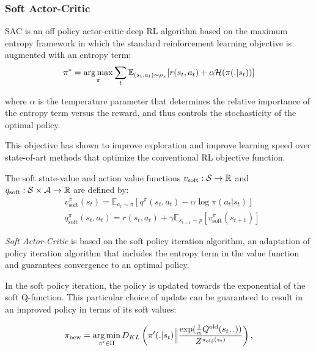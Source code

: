 \subsubsection{Soft Actor-Critic}
SAC \cite{SAC, SAC_modified} is an off policy actor-critic deep RL algorithm based on the maximum entropy framework in which the standard reinforcement learning
objective is augmented with an entropy term:
\begin{equation*}
    \pi^* = \operatorname*{arg\,max}_\pi \sum_t \mathbb{E}_{(s_t, a_t) \sim \rho_\pi}[r(s_t, a_t) + \alpha \mathcal{H}(\pi(.|s_t))]
\end{equation*}

where $\alpha$ is the temperature parameter that determines the relative importance of the entropy term versus the reward, and thus controls the stochasticity
of the optimal policy.

This objective has shown to improve exploration and improve learning speed over state-of-art methods that optimize the conventional RL objective function.

\begin{definition}
    The soft state-value and action value functions  $v_{\text{soft}}: \mathcal{S} \to \mathbb{R}$ and $q_{\text{soft}}: \mathcal{S} \times \mathcal{A} \to \mathbb{R}$ are defined by:
    \begin{align*} 
        &v_\text{soft}^\pi(s_t) = \mathbb{E}_{a_t \sim \pi }[q^\pi(s_t, a_t) - \alpha \log \pi(a_t | s_t)] \\
        &q_\text{soft}^\pi(s_t, a_t) = r(s_t, a_t) + \gamma \mathbb{E}_{s_{t+1} \sim \mathit{p}}[v_\text{soft}^\pi(s_{t+1})]
    \end{align*}
\end{definition}

\textit{Soft Actor-Critic} is based on the soft policy iteration algorithm, an adaptation of policy iteration algorithm that includes the entropy term in the value function
and guarantees convergence to an optimal policy.

In the soft policy iteration, the policy is updated towards the exponential of the soft Q-function. This particular choice of update can be guaranteed
to result in an improved policy in terms of its soft values:

\begin{equation}
    \label{eq:soft_policy_improvement}
    \pi_\text{new} = \operatorname*{arg\,min}_{\pi' \in \Pi} D_{KL} \left(\pi'(.|s_t) \Big\Vert \frac{\exp(\frac{1}{\alpha}Q^\text{old}(s_t, .))}{Z^{\pi_{\text{old}}(s_t)}}\right),
\end{equation}

